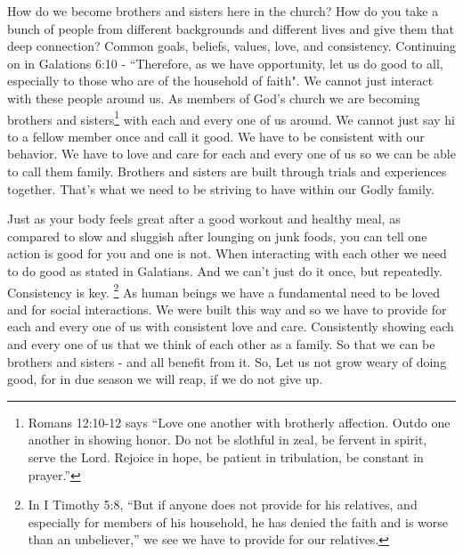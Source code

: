 \documentclass[11pt]{article}
\begin{document}
\begin{multicols}{2}
How do we become brothers and sisters here in the church? How do you take a bunch of people from different backgrounds and different lives and give them that deep connection? Common goals, beliefs, values, love, and consistency. Continuing on in Galations 6:10 - ``Therefore, as we have opportunity, let us do good to all, especially to those who are of the household of faith". We cannot just interact with these people around us. As members of God's church we are becoming brothers and sisters\footnote{Romans 12:10-12 says ``Love one another with brotherly affection. Outdo one another in showing honor. Do not be slothful in zeal, be fervent in spirit, serve the Lord. Rejoice in hope, be patient in tribulation, be constant in prayer.''} with each and every one of us around. We cannot just say hi to a fellow member once and call it good. We have to be consistent with our behavior. We have to love and care for each and every one of us so we can be able to call them family. Brothers and sisters are built through trials and experiences together. That's what we need to be striving to have within our Godly family. 

Just as your body feels great after a good workout and healthy meal, as compared to slow and sluggish after lounging on junk foods, you can tell one action is good for you and one is not. When interacting with each other we need to do good as stated in Galatians. And we can't just do it once, but repeatedly. Consistency is key. \footnote{In I Timothy 5:8, ``But if anyone does not provide for his relatives, and especially for members of his household, he has denied the faith and is worse than an unbeliever,'' we see we have to provide for our relatives.} As human beings we have a fundamental need to be loved and for social interactions. We were built this way and so we have to provide for each and every one of us with consistent love and care. Consistently showing each and every one of us that we think of each other as a family. So that we can be brothers and sisters - and all benefit from it. So, Let us not grow weary of doing good, for in due season we will reap, if we do not give up.

\end{multicols}


\end{document}

